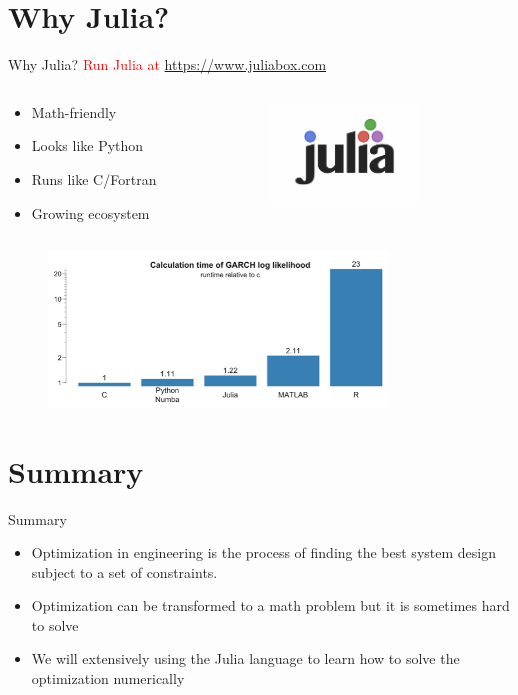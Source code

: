 \documentclass{beamer}
\begin{document}
\section{Why Julia?}
\begin{frame}{Why Julia?}
\textcolor{red}{Run Julia at } \url{https://www.juliabox.com}

\begin{columns}

\begin{column}{.5\textwidth}
\begin{itemize}
    \item Math-friendly
    \item Looks like Python 
    \item Runs like C/Fortran
    \item Growing ecosystem
\end{itemize}
\end{column}

\begin{column}{.5\textwidth}
\begin{figure}
\centering
\includegraphics[width=40mm]{Figs/julia.png}
\end{figure}
\end{column}
\end{columns}
\begin{figure}
\centering
\includegraphics[width=90mm]{Figs/julia-comp.png}
\end{figure}
\end{frame}


\section{Summary}
\begin{frame}{Summary}
    \begin{itemize}
        \item Optimization in engineering is the process of finding the best system design subject to a set of constraints.
        \item Optimization can be transformed to a math problem but it is sometimes hard to solve
        \item We will extensively using the Julia language to learn how to solve the optimization numerically
    \end{itemize}
\end{frame}
\end{document}
